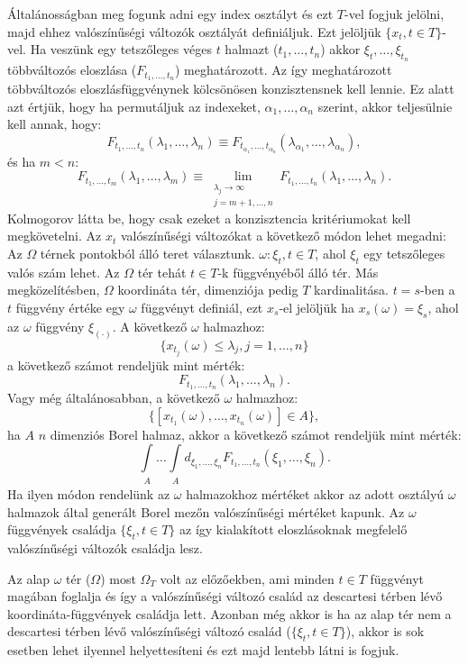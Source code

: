 \documentclass{article}
\begin{document}
Általánosságban meg fogunk adni egy index osztályt és ezt $T$-vel fogjuk jelölni, majd ehhez valószínűségi változók osztályát definiáljuk. Ezt jelöljük $\{x_t,t \in T\}$-vel. Ha veszünk egy tetszőleges véges $t$ halmazt ($t_1,\ldots,t_n$) akkor $\xi_t,\ldots,\xi_{t_n}$ többváltozós eloszlása ($F_{t_1,\ldots,t_n}$) meghatározott. Az így meghatározott többváltozós eloszlásfüggvénynek kölcsönösen konzisztensnek kell lennie. Ez alatt azt értjük, hogy ha permutáljuk az indexeket, $\alpha_1,\ldots,\alpha_n$ szerint, akkor teljesülnie kell annak, hogy:
\[
	F_{t_1,\ldots,t_n} (\lambda_1,\ldots,\lambda_n) \equiv F_{t_{\alpha_1},\ldots,t_{\alpha_n}} (\lambda_{\alpha_1},\ldots,\lambda_{\alpha_n}),
\]
és ha $m < n$:
\[
	F_{t_1,\ldots,t_m} (\lambda_1,\ldots,\lambda_m) \equiv \lim_{\substack{\lambda_j \to \infty \\ j=m+1,\ldots,n }}F_{t_1,\ldots,t_n} (\lambda_1,\ldots,\lambda_n).
\]
Kolmogorov látta be, hogy csak ezeket a konzisztencia kritériumokat kell megkövetelni. Az $x_t$ valószínűségi változókat a következő módon lehet megadni: Az $\Omega$ térnek pontokból álló teret választunk. $\omega : \xi_t, t \in T$, ahol $\xi_t$ egy tetszőleges valós szám lehet. Az $\Omega$ tér tehát $t \in T$-k függvényéből álló tér. Más megközelítésben, $\Omega$ koordináta tér, dimenziója pedig $T$ kardinalitása. $t=s$-ben a $t$ függvény értéke egy $\omega$ függvényt definiál, ezt $x_s$-el jelöljük ha $x_s(\omega) = \xi_s$, ahol az $\omega$ függvény $\xi_{(\cdot)}$. A következő $\omega$ halmazhoz:
\[
 \{x_{t_j}(\omega) \leq \lambda_j , j=1,\ldots,n\}
\]
a következő számot rendeljük mint mérték:
\[
	F_{t_1,\ldots,t_n} (\lambda_1,\ldots,\lambda_n).
\]
Vagy még általánosabban, a következő $\omega$ halmazhoz:
\[
	\{[x_{t_1}(\omega),\ldots,x_{t_n}(\omega)] \in A\},
\]
ha $A$ $n$ dimenziós Borel halmaz, akkor a következő számot rendeljük mint mérték:
\[
 \int\limits_{\substack{A}} \ldots \int\limits_{\substack{A}}  d_{\xi_1,\ldots,\xi_n}F_{t_1,\ldots,t_n}(\xi_1,\ldots,\xi_n).
\]
Ha ilyen módon rendelünk az $\omega$ halmazokhoz mértéket akkor az adott osztályú $\omega$ halmazok által generált Borel mezőn valószínűségi mértéket kapunk. Az $\omega$ függvények családja $\{\xi_t, t \in T\}$ az így kialakított eloszlásoknak megfelelő valószínűségi változók családja lesz. 

Az alap $\omega$ tér ($\Omega$) most $\Omega_T$ volt az előzőekben, ami minden $t \in T$ függvényt magában foglalja és így a valószínűségi változó család az descartesi térben lévő koordináta-függvények családja lett. Azonban még akkor is ha az alap tér nem a descartesi térben lévő valószínűségi változó család ($\{\xi_t, t \in T\}$), akkor is sok esetben lehet ilyennel helyettesíteni és ezt majd lentebb látni is fogjuk. 
\end{document}
